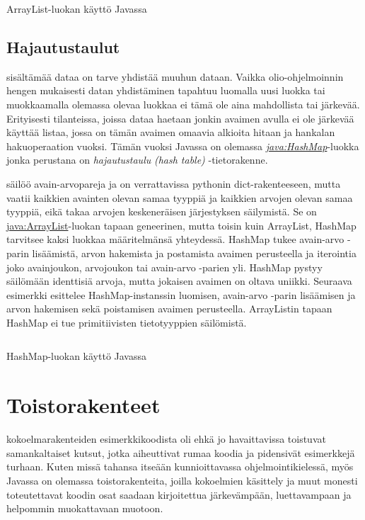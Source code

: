 \documentclass{tufte-book}
\newcommand{\eng}[1]{\textit{(#1)}}
\newcommand{\new}[1]{\textit{\gls{#1}}}
\newcommand{\neweng}[2]{\new{#1} \eng{#2}}
\newcommand{\java}[1]{\underline{\gls{java:#1}}}
\newcommand{\newjava}[1]{\textit{\java{#1}}}
\newcommand{\code}[3]{
\begin{listing}
    \inputminted{java}{OhjelmointiopasEsimerkit/src/#1/#2.java}
    \caption{#3}
    \label{Java-#1-#2}
\end{listing}
}
\begin{document}
\code{week3/basicexamples}{ArrayListUsage}{ArrayList-luokan käyttö Javassa}

\subsection{Hajautustaulut}
\label{HashMap}

 sisältämää dataa on tarve yhdistää muuhun dataan. Vaikka
olio-ohjelmoinnin hengen mukaisesti datan yhdistäminen tapahtuu luomalla uusi luokka tai
muokkaamalla olemassa olevaa luokkaa ei tämä ole aina mahdollista tai järkevää. Erityisesti
tilanteissa, joissa dataa haetaan jonkin avaimen avulla ei ole järkevää käyttää listaa, jossa on
tämän avaimen omaavia alkioita hitaan ja hankalan hakuoperaation vuoksi. Tämän vuoksi Javassa
on olemassa \newjava{HashMap}-luokka jonka perustana on \neweng{hajautustaulu}{hash table}
-tietorakenne.

\newthought{\java{HashMap}-luokka} säilöö avain-arvopareja ja on verrattavissa pythonin
dict-rakenteeseen, mutta vaatii kaikkien avainten olevan samaa tyyppiä ja kaikkien arvojen olevan
samaa tyyppiä, eikä takaa arvojen keskeneräisen järjestyksen säilymistä. Se on 
\java{ArrayList}-luokan tapaan geneerinen, mutta toisin kuin ArrayList, HashMap tarvitsee kaksi
luokkaa määritelmänsä yhteydessä. HashMap tukee avain-arvo -parin lisäämistä, arvon hakemista ja
postamista avaimen perusteella ja iterointia joko avainjoukon, arvojoukon tai avain-arvo -parien
yli. HashMap pystyy säilömään identtisiä arvoja, mutta jokaisen avaimen on oltava uniikki.
Seuraava esimerkki esittelee HashMap-instanssin luomisen, avain-arvo -parin lisäämisen ja
arvon hakemisen sekä poistamisen avaimen perusteella. ArrayListin tapaan HashMap ei tue
primitiivisten tietotyyppien säilömistä.

\code{week3/basicexamples}{HashMapUsage}{HashMap-luokan käyttö Javassa}


\section{Toistorakenteet}
\label{loopeista}

 kokoelmarakenteiden esimerkkikoodista oli ehkä jo havaittavissa
toistuvat samankaltaiset kutsut, jotka aiheuttivat rumaa koodia ja pidensivät esimerkkejä turhaan.
Kuten missä tahansa itseään kunnioittavassa ohjelmointikielessä, myös Javassa on olemassa
toistorakenteita, joilla kokoelmien käsittely ja muut monesti toteutettavat koodin osat saadaan
kirjoitettua järkevämpään, luettavampaan ja helpommin muokattavaan muotoon.
\end{document}
